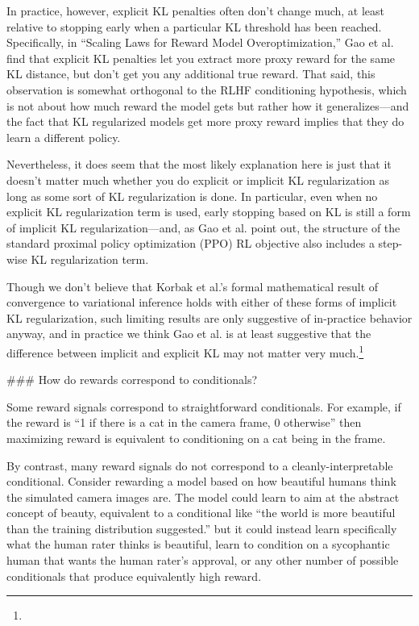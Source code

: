 {In practice, however, explicit KL penalties often don't change much, at least relative to stopping early when a particular KL threshold has been reached. Specifically, in ``Scaling Laws for Reward Model Overoptimization\cite{TODO: cite https://arxiv.org/abs/2210.10760},'' Gao et al. find that explicit KL penalties let you extract more proxy reward for the same KL distance, but don't get you any additional true reward. That said, this observation is somewhat orthogonal to the RLHF conditioning hypothesis, which is not about how much reward the model gets but rather how it generalizes---and the fact that KL regularized models get more proxy reward implies that they do learn a different policy.

Nevertheless, it does seem that the most likely explanation here is just that it doesn't matter much whether you do explicit or implicit KL regularization as long as some sort of KL regularization is done. In particular, even when no explicit KL regularization term is used, early stopping based on KL is still a form of implicit KL regularization---and, as Gao et al. point out, the structure of the standard proximal policy optimization (PPO) RL objective also includes a step-wise KL regularization term.

Though we don't believe that Korbak et al.'s formal mathematical result of convergence to variational inference holds with either of these forms of implicit KL regularization, such limiting results are only suggestive of in-practice behavior anyway, and in practice we think Gao et al. is at least suggestive that the difference between implicit and explicit KL may not matter very much.\footnote{}


### How do rewards correspond to conditionals?

Some reward signals correspond to straightforward conditionals. For example, if the reward is ``1 if there is a cat in the camera frame, 0 otherwise'' then maximizing reward is equivalent to conditioning on a cat being in the frame.

By contrast, many reward signals do not correspond to a cleanly-interpretable conditional. Consider rewarding a model based on how beautiful humans think the simulated camera images are. The model could learn to aim at the abstract concept of beauty, equivalent to a conditional like ``the world is more beautiful than the training distribution suggested.'' but it could instead learn specifically what the human rater thinks is beautiful, learn to condition on a sycophantic human that wants the human rater's approval, or any other number of possible conditionals that produce equivalently high reward.

}

